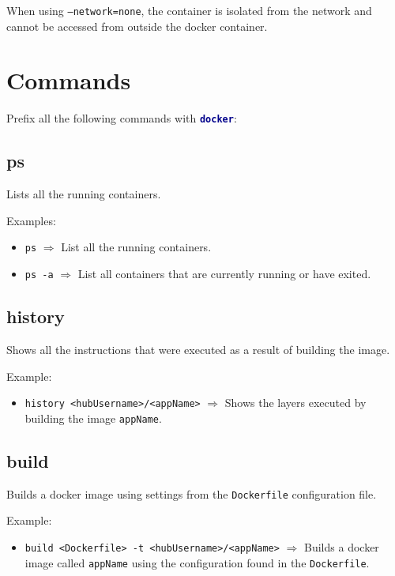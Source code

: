 \documentclass[a4paper, 12pt]{article}
\newcommand{\bc}[2]{\textbf{\textcolor{#1}{#2}}}
\begin{document}
\vspace{0.8em}
When using \texttt{--network=none}, the container is isolated from the network
and cannot be accessed from outside the docker container.

\section{Commands}

Prefix all the following commands with \texttt{\bc{darkblue}{docker}}:

\subsection{ps}

Lists all the running containers.

\vspace{0.5em}
Examples:
\begin{itemize}
	\item \texttt{ps} $\Rightarrow$ List all the running containers.
	\item \texttt{ps -a} $\Rightarrow$ List all containers that are currently
	running or have exited.
\end{itemize}

\subsection{history}

Shows all the instructions that were executed as a result of building the image.

\vspace{0.5em}
Example:
\begin{itemize}
	\item \texttt{history <hubUsername>/<appName>} $\Rightarrow$ Shows the
	layers executed by building the image \texttt{appName}.
\end{itemize}

\subsection{build}

Builds a docker image using settings from the \texttt{Dockerfile} configuration
file.

\vspace{0.5em}
Example:
\begin{itemize}
	\item \texttt{build <Dockerfile> -t <hubUsername>/<appName>} $\Rightarrow$
	Builds a docker image called \texttt{appName} using the configuration found
	in the \texttt{Dockerfile}.
\end{itemize}
\end{document}
